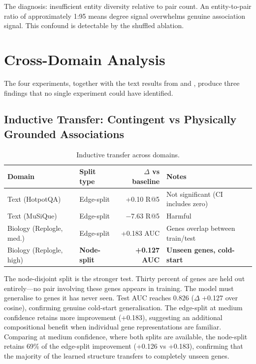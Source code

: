 \documentclass[11pt]{article}
\begin{document}
The diagnosis: insufficient entity diversity relative to pair count. An entity-to-pair ratio of approximately 1:95 means degree signal overwhelms genuine association signal. This confound is detectable by the shuffled ablation.

\section{Cross-Domain Analysis}
\label{sec:cross_domain}

The four experiments, together with the text results from \citet{dury2026aar} and \citet{dury2026concepts}, produce three findings that no single experiment could have identified.

\subsection{Inductive Transfer: Contingent vs Physically Grounded Associations}
\label{sec:inductive}

\begin{table}[h]
\centering
\caption{Inductive transfer across domains.}
\label{tab:inductive}
\begin{tabular}{llrl}
\toprule
Domain & Split type & $\Delta$ vs baseline & Notes \\
\midrule
Text (HotpotQA) & Edge-split & +0.10 R@5 & Not significant (CI includes zero) \\
Text (MuSiQue) & Edge-split & $-$7.63 R@5 & Harmful \\
Biology (Replogle, med.) & Edge-split & +0.183 AUC & Genes overlap between train/test \\
Biology (Replogle, high) & \textbf{Node-split} & \textbf{+0.127 AUC} & \textbf{Unseen genes, cold-start} \\
\bottomrule
\end{tabular}
\end{table}

The node-disjoint split is the stronger test. Thirty percent of genes are held out entirely---no pair involving these genes appears in training. The model must generalise to genes it has never seen. Test AUC reaches 0.826 ($\Delta$ +0.127 over cosine), confirming genuine cold-start generalisation. The edge-split at medium confidence retains more improvement (+0.183), suggesting an additional compositional benefit when individual gene representations are familiar. Comparing at medium confidence, where both splits are available, the node-split retains 69\% of the edge-split improvement (+0.126 vs +0.183), confirming that the majority of the learned structure transfers to completely unseen genes.
\end{document}
